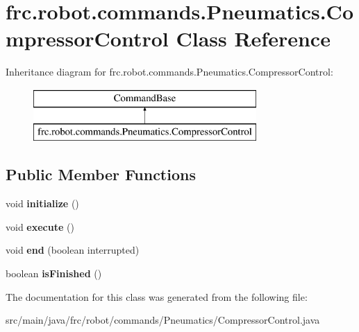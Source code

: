 \hypertarget{classfrc_1_1robot_1_1commands_1_1_pneumatics_1_1_compressor_control}{}\section{frc.\+robot.\+commands.\+Pneumatics.\+Compressor\+Control Class Reference}
\label{classfrc_1_1robot_1_1commands_1_1_pneumatics_1_1_compressor_control}
Inheritance diagram for frc.\+robot.\+commands.\+Pneumatics.\+Compressor\+Control\+:\begin{figure}[H]
\begin{center}
\leavevmode
\includegraphics[height=2.000000cm]{classfrc_1_1robot_1_1commands_1_1_pneumatics_1_1_compressor_control}
\end{center}
\end{figure}
\subsection*{Public Member Functions}
\begin{DoxyCompactItemize}
\item 
\mbox{\label{classfrc_1_1robot_1_1commands_1_1_pneumatics_1_1_compressor_control_a2de5aac04e24e2060fcc4d3eda42fe2a}} 
void {\bfseries initialize} ()
\item 
\mbox{\label{classfrc_1_1robot_1_1commands_1_1_pneumatics_1_1_compressor_control_a7e83559f75dccc1942e61f4c0d7b39ad}} 
void {\bfseries execute} ()
\item 
\mbox{\label{classfrc_1_1robot_1_1commands_1_1_pneumatics_1_1_compressor_control_a6f906e0b9c6db96e5279e9dd49327723}} 
void {\bfseries end} (boolean interrupted)
\item 
\mbox{\label{classfrc_1_1robot_1_1commands_1_1_pneumatics_1_1_compressor_control_a35848647fc0da51b8e5bc20c14b2166c}} 
boolean {\bfseries is\+Finished} ()
\end{DoxyCompactItemize}


The documentation for this class was generated from the following file\+:\begin{DoxyCompactItemize}
\item 
src/main/java/frc/robot/commands/\+Pneumatics/Compressor\+Control.\+java\end{DoxyCompactItemize}
